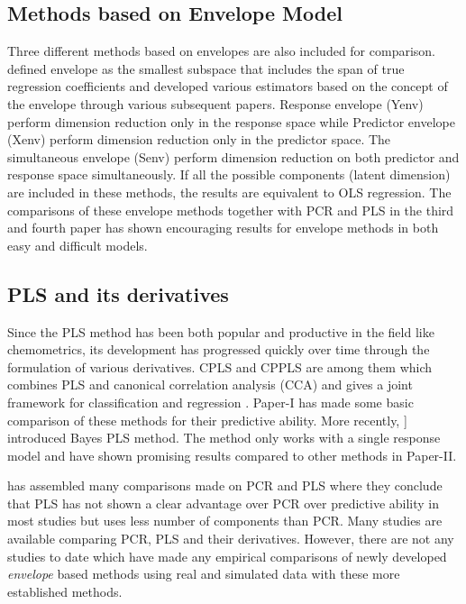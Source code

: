 \documentclass[11pt,twoside,openright,titlepage,
  headinclude,footinclude,BCOR=5mm,
  numbers=noenddot,cleardoublepage=empty,
  tablecaptionabove, dottedtoc,
  bibliography=totoc,paper=a4]{scrreprt}
\begin{document}
\hypertarget{methods-based-on-envelope-model}{%
\subsection{Methods based on Envelope Model}\label{methods-based-on-envelope-model}}

Three different methods based on envelopes are also included for comparison. \citet{Cook2007a} defined envelope as the smallest subspace that includes the span of true regression coefficients and developed various estimators based on the concept of the envelope through various subsequent papers. Response envelope (Yenv) \citep{cook2010envelope} perform dimension reduction only in the response space while Predictor envelope (Xenv) \citep{cook2013envelopes} perform dimension reduction only in the predictor space. The simultaneous envelope (Senv) \citep{cook2015simultaneous} perform dimension reduction on both predictor and response space simultaneously. If all the possible components (latent dimension) are included in these methods, the results are equivalent to OLS regression. The comparisons of these envelope methods together with PCR and PLS in the third and fourth paper has shown encouraging results for envelope methods in both easy and difficult models.

\hypertarget{pls-and-its-derivatives}{%
\subsection{PLS and its derivatives}\label{pls-and-its-derivatives}}

Since the PLS method has been both popular and productive in the field like chemometrics, its development has progressed quickly over time through the formulation of various derivatives. CPLS and CPPLS are among them which combines PLS and canonical correlation analysis (CCA) and gives a joint framework for classification and regression \citep{indahl2009canonical}. Paper-I has made some basic comparison of these methods for their predictive ability. More recently, \citet{helland2012near}{]} introduced Bayes PLS method. The method only works with a single response model and have shown promising results compared to other methods in Paper-II.

\citet{WENTZELL2003257} has assembled many comparisons made on PCR and PLS where they conclude that PLS has not shown a clear advantage over PCR over predictive ability in most studies but uses less number of components than PCR. Many studies are available comparing PCR, PLS and their derivatives. However, there are not any studies to date which have made any empirical comparisons of newly developed \emph{envelope} based methods using real and simulated data with these more established methods.
\end{document}

